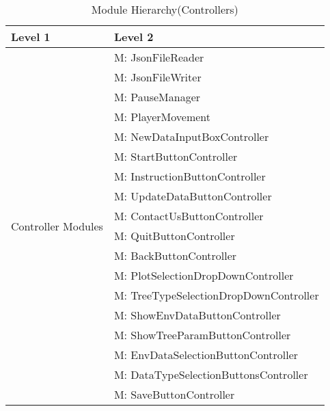 \documentclass[12pt, titlepage]{article}
\newcounter{mnum}
\newcommand{\mthemnum}{M\themnum}
\begin{document}
\begin{table}[H]
\caption{Module Hierarchy(Controllers)}
\label{TblControllers}

\centering
\begin{tabular}{p{} p{}}
\toprule
\textbf{Level 1} & \textbf{Level 2}\\
\midrule

\multirow{18}{0.3\textwidth}{Controller Modules}
& {mnum} \mthemnum \label{Controller1}: JsonFileReader \\
& {mnum} \mthemnum \label{Controller2}: JsonFileWriter  \\
& {mnum} \mthemnum \label{Controller3}: PauseManager  \\
& {mnum} \mthemnum \label{Controller4}: PlayerMovement  \\
& {mnum} \mthemnum \label{Controller5}: NewDataInputBoxController\\
& {mnum} \mthemnum \label{Controller6}: StartButtonController  \\
& {mnum} \mthemnum \label{Controller7}: InstructionButtonController \\
& {mnum} \mthemnum \label{Controller8}: UpdateDataButtonController\\
& {mnum} \mthemnum \label{Controller9}: ContactUsButtonController \\
& {mnum} \mthemnum \label{Controller10}: QuitButtonController  \\
& {mnum} \mthemnum \label{Controller11}: BackButtonController \\
& {mnum} \mthemnum \label{Controller12}: PlotSelectionDropDownController \\
& {mnum} \mthemnum \label{Controller13}: TreeTypeSelectionDropDownController \\
& {mnum} \mthemnum \label{Controller14}: ShowEnvDataButtonController \\
& {mnum} \mthemnum \label{Controller15}: ShowTreeParamButtonController \\
& {mnum} \mthemnum \label{Controller16}: EnvDataSelectionButtonController\\
& {mnum} \mthemnum \label{Controller17}: DataTypeSelectionButtonsController \\
& {mnum} \mthemnum \label{Controller18}: SaveButtonController \\
\bottomrule

\end{tabular}
\end{table}
\end{document}
